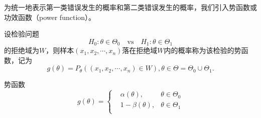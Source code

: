 为统一地表示第一类错误发生的概率和第二类错误发生的概率，我们引入势函数或功效函数（power function）。
\begin{definition}
    设检验问题
    $$
    H_0: \theta\in \Theta_0 \quad \text{vs} \quad H_1: \theta\in\Theta_1
    $$
    的拒绝域为$W$，则样本$(x_1,x_2,\cdots,x_n)$落在拒绝域$W$内的概率称为该检验的势函数，记为
    $$
    g(\theta) = P_{\theta}((x_1,x_2,\cdots,x_n) \in W), \theta \in \Theta=\Theta_0 \cup \Theta_1.
    $$
\end{definition}
\begin{remark}
    势函数
    $$
    g(\theta) = \left\{
    \begin{aligned}
    & \alpha(\theta), & \theta\in\Theta_0\\
    & 1-\beta(\theta), & \theta\in\Theta_1\\
    \end{aligned}
    \right.
    $$
\end{remark}
\begin{note}
    \vspace{6cm}
\end{note}

